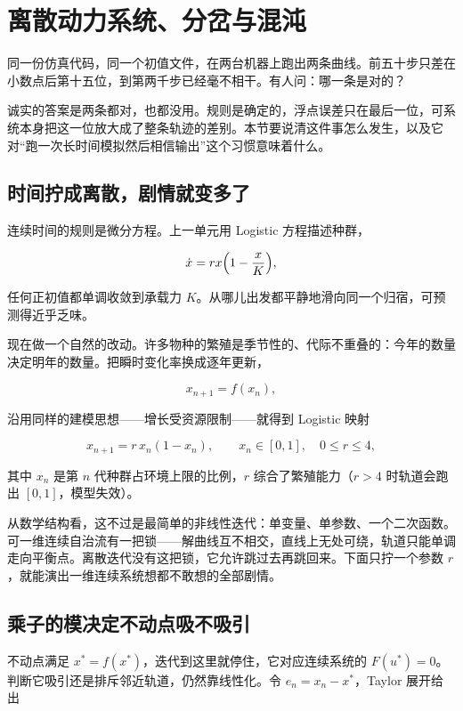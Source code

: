 \section{离散动力系统、分岔与混沌}
\label{sec:15-Differential-Equations-and-Dynamical-Systems/02-Stability-and-Dynamical-Systems/03}

同一份仿真代码，同一个初值文件，在两台机器上跑出两条曲线。前五十步只差在小数点后第十五位，到第两千步已经毫不相干。有人问：哪一条是对的？

诚实的答案是两条都对，也都没用。规则是确定的，浮点误差只在最后一位，可系统本身把这一位放大成了整条轨迹的差别。本节要说清这件事怎么发生，以及它对``跑一次长时间模拟然后相信输出''这个习惯意味着什么。

\subsection{时间拧成离散，剧情就变多了}

连续时间的规则是微分方程。上一单元用 Logistic 方程描述种群，

\[
\dot x = rx\Bigl(1-\frac{x}{K}\Bigr),
\]

任何正初值都单调收敛到承载力 \(K\)。从哪儿出发都平静地滑向同一个归宿，可预测得近乎乏味。

现在做一个自然的改动。许多物种的繁殖是季节性的、代际不重叠的：今年的数量决定明年的数量。把瞬时变化率换成逐年更新，

\[
x_{n+1} = f(x_n),
\]

沿用同样的建模思想——增长受资源限制——就得到 Logistic 映射

\[
x_{n+1} = r\,x_n(1-x_n),
\qquad x_n\in[0,1],\quad 0\le r\le 4,
\]

其中 \(x_n\) 是第 \(n\) 代种群占环境上限的比例，\(r\) 综合了繁殖能力（\(r>4\) 时轨道会跑出 \([0,1]\)，模型失效）。

从数学结构看，这不过是最简单的非线性迭代：单变量、单参数、一个二次函数。可一维连续自治流有一把锁——解曲线互不相交，直线上无处可绕，轨道只能单调走向平衡点。离散迭代没有这把锁，它允许跳过去再跳回来。下面只拧一个参数 \(r\)，就能演出一维连续系统想都不敢想的全部剧情。

\subsection{乘子的模决定不动点吸不吸引}

不动点满足 \(x^\ast=f(x^\ast)\)，迭代到这里就停住，它对应连续系统的 \(F(u^\ast)=0\)。判断它吸引还是排斥邻近轨道，仍然靠线性化。令 \(e_n=x_n-x^\ast\)，Taylor 展开给出

